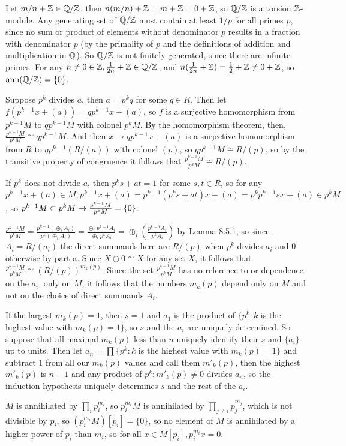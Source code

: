 \documentclass[11pt, oneside]{article}   	%
\begin{document}
\item Let $m/n + \mathbb{Z} \in \mathbb{Q} / \mathbb{Z}$, then $n(m/n) + \mathbb{Z} = m + \mathbb{Z} = 0 + \mathbb{Z}$, so $\mathbb{Q} / \mathbb{Z}$ is a torsion $\mathbb{Z}$-module. Any generating set of $\mathbb{Q} / \mathbb{Z}$ must contain at least $1/p$ for all primes $p$, since no sum or product of elements without denominator $p$ results in a fraction with denominator $p$ (by the primality of $p$ and the definitions of addition and multiplication in $\mathbb{Q}$). So $\mathbb{Q} / \mathbb{Z}$ is not finitely generated, since there are infinite primes. For any $n \not = 0 \in \mathbb{Z}, \frac{1}{2n} + \mathbb{Z} \in \mathbb{Q}/\mathbb{Z}$, and $n(\frac{1}{2n} + \mathbb{Z}) = \frac{1}{2} + \mathbb{Z} \not = 0 + \mathbb{Z}$, so $\text{ann}(\mathbb{Q} / \mathbb{Z}) = \{0\}$.
\item \be
\item Suppose $p^k$ divides $a$, then $a = p^kq$ for some $q \in R$. Then let $f(p^{k-1}x + (a)) = qp^{k-1}x+ (a)$, so $f$ is a surjective homomorphism from $p^{k-1}M$ to $qp^{k-1}M$ with colonel $p^kM$. By the homomorphism theorem, then, $\frac{p^{k-1}M}{p^kM} \cong qp^{k-1}M$. And then $x \to qp^{k-1}x + (a)$ is a surjective homomorphism from $R$ to $qp^{k-1}(R/(a))$ with colonel $(p)$, so $qp^{k-1}M \cong R / (p)$, so by the transitive property of congruence it follows that $\frac{p^{k-1}M}{p^kM} \cong R / (p)$.

If $p^k$ does not divide $a$, then $p^ks + at = 1$ for some $s, t \in R$, so for any $p^{k-1}x + (a) \in M, p^{k-1}x + (a) = p^{k-1}(p^ks + at)x + (a) = p^kp^{k-1}sx + (a) \in p^kM$, so $p^{k-1}M \subset p^kM \rightarrow \frac{p^{k-1}M}{p^kM} = \{0\}$.
\item $\frac{p^{k-1}M}{p^kM} = \frac{p^{k-1}(\oplus_iA_i)}{p^k(\oplus_iA_i)} = \frac{\oplus_ip^{k-1}A_i}{\oplus_ip^kA_i} = \oplus_i(\frac{p^{k-1}A_i}{p^kA_i})$ by Lemma 8.5.1, so since $A_i = R/(a_i)$ the direct summands here are $R/(p)$ when $p^k$ divides $a_i$ and 0 otherwise by part a. Since $X \oplus 0 \cong X$ for any set $X$, it follows that $\frac{p^{k-1}M}{p^kM} \cong (R/(p))^{m_k(p)}$. Since the set $\frac{p^{k-1}M}{p^kM}$ has no reference to or dependence on the $a_i$, only on $M$, it follows that the numbers $m_k(p)$ depend only on $M$ and not on the choice of direct summands $A_i$.
\item If the largest $m_k(p) = 1$, then $s=1$ and $a_1$ is the product of $\{p^k: k$ is the highest value with $m_k(p) = 1\}$, so $s$ and the $a_i$ are uniquely determined. So suppose that all maximal $m_k(p)$ less than $n$ uniquely identify their $s$ and $\{a_i\}$ up to units. Then let $a_n = \prod \{p^k: k$ is the highest value with $m_k(p) = 1\}$ and subtract 1 from all our $m_k(p)$ values and call them $m'_k(p)$, then the highest $m'_k(p)$ is $n-1$ and any product of $p^k: m'_k(p) \not = 0$ divides $a_n$, so the induction hypothesis uniquely determines $s$ and the rest of the $a_i$.
\ee
\item $M$ is annihilated by $\prod_ip_i^{m_i}$, so $p_i^{m_i}M$ is annihilated by $\prod_{j \not = i} p_j^{m_j}$, which is not divisible by $p_i$, so $(p_i^{m_i}M)[p_i] = \{0\}$, so no element of $M$ is annihilated by a higher power of $p_i$ than $m_i$, so for all $x \in M[p_i], p_i^{m_i}x = 0$.
\ee
\end{document}
